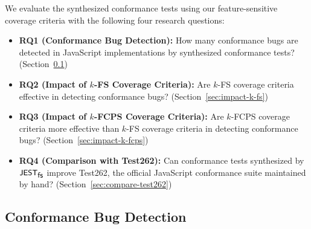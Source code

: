 We evaluate the synthesized conformance tests using our feature-sensitive
coverage criteria with the following four research questions:
\begin{itemize}
  \item \textbf{RQ1 (Conformance Bug Detection):} How many conformance bugs are
    detected in JavaScript implementations by synthesized conformance tests?
    (Section~\ref{sec:conform-bug})
  \item \textbf{RQ2 (Impact of $k$-FS Coverage Criteria):} Are $k$-FS coverage
    criteria effective in detecting conformance bugs?
    (Section~\ref{sec:impact-k-fs})
  \item \textbf{RQ3 (Impact of $k$-FCPS Coverage Criteria):} Are $k$-FCPS
    coverage criteria more effective than $k$-FS coverage criteria in detecting
    conformance bugs? (Section~\ref{sec:impact-k-fcps})
  \item \textbf{RQ4 (Comparison with Test262):} Can conformance tests
    synthesized by $\textsf{\small JEST}_{\textsf{\small fs}}$ improve Test262, the official JavaScript conformance
    suite maintained by hand? (Section~\ref{sec:compare-test262})
\end{itemize}


\subsection{Conformance Bug Detection}\label{sec:conform-bug}

